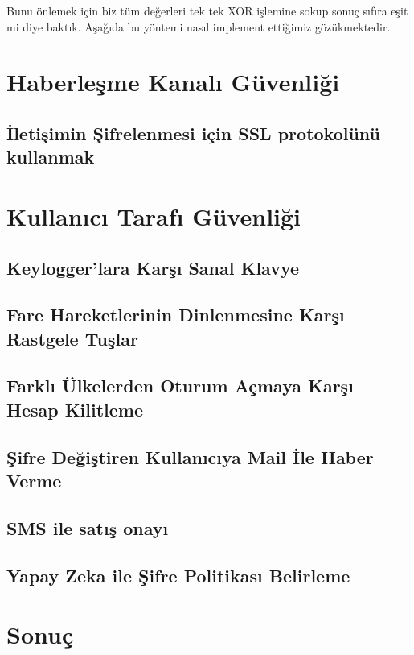 \documentclass[11pt]{report}
\begin{document}
Bunu önlemek için biz tüm değerleri tek tek XOR işlemine sokup sonuç sıfıra eşit mi diye baktık. Aşağıda bu yöntemi nasıl implement ettiğimiz gözükmektedir.

\chapter{Haberleşme Kanalı Güvenliği}

\section{İletişimin Şifrelenmesi için SSL protokolünü kullanmak}


\chapter{Kullanıcı Tarafı Güvenliği}
\section{Keylogger'lara Karşı Sanal Klavye}
\section{Fare Hareketlerinin Dinlenmesine Karşı Rastgele Tuşlar}
\section{Farklı Ülkelerden Oturum Açmaya Karşı Hesap Kilitleme}
\section{Şifre Değiştiren Kullanıcıya Mail İle Haber Verme}
\section{SMS ile satış onayı}
\section{Yapay Zeka ile Şifre Politikası Belirleme}

\chapter{Sonuç}
\end{document}
